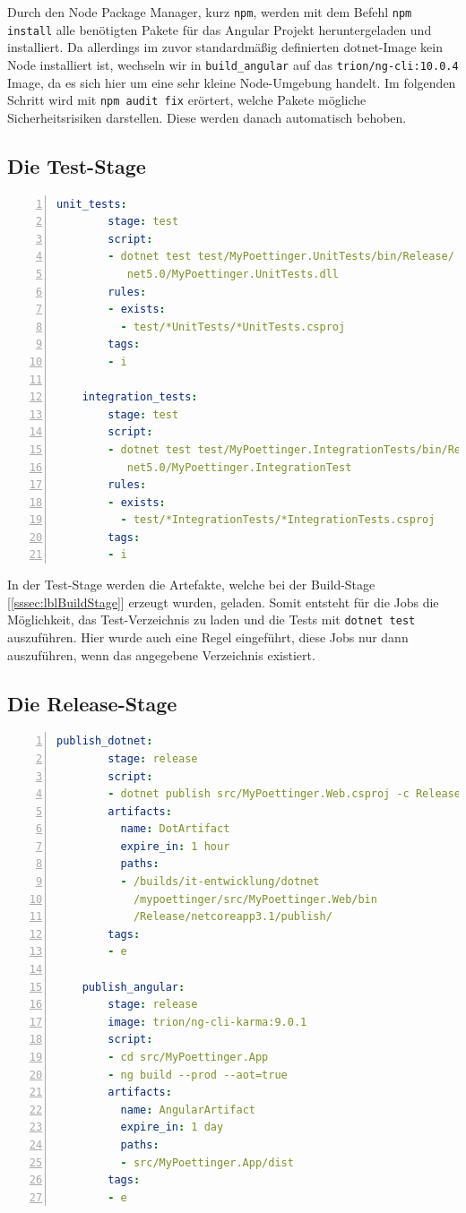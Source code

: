 Durch den Node Package Manager, kurz \texttt{npm}, werden mit dem Befehl \texttt{npm install} alle benötigten Pakete für das Angular Projekt heruntergeladen und installiert. Da allerdings im zuvor standardmäßig definierten dotnet-Image kein Node installiert ist, wechseln wir in \texttt{build\_angular} auf das \texttt{trion/ng-cli:10.0.4} Image, da es sich hier um eine sehr kleine Node-Umgebung handelt. Im folgenden Schritt wird mit \texttt{npm audit fix} erörtert, welche Pakete mögliche Sicherheitsrisiken darstellen. Diese werden danach automatisch behoben. 

\newpage

\subsection{Die Test-Stage}

\begin{lstlisting}[caption={Die Test-Stage der gitlab-ci.yml Datei},captionpos=b, numbers=left, backgroundcolor=\color{black!10},
language=yaml]
	unit_tests:
		stage: test
		script: 
		- dotnet test test/MyPoettinger.UnitTests/bin/Release/
		   net5.0/MyPoettinger.UnitTests.dll
		rules:
		- exists:
		  - test/*UnitTests/*UnitTests.csproj
		tags:
		- i  
	
	integration_tests:
		stage: test
		script: 
		- dotnet test test/MyPoettinger.IntegrationTests/bin/Release/
		   net5.0/MyPoettinger.IntegrationTest
		rules:
		- exists:
		  - test/*IntegrationTests/*IntegrationTests.csproj
		tags:
		- i
\end{lstlisting}

In der Test-Stage werden die Artefakte, welche bei der Build-Stage [\ref{sssec:lblBuildStage}] erzeugt wurden, geladen. Somit entsteht für die Jobs die Möglichkeit, das Test-Verzeichnis zu laden und die Tests mit \texttt{dotnet test} auszuführen. Hier wurde auch eine Regel eingeführt, diese Jobs nur dann auszuführen, wenn das angegebene Verzeichnis existiert. 

\newpage

\subsection{Die Release-Stage}

\begin{lstlisting}[caption={Die Release-Stage der gitlab-ci.yml Datei},captionpos=b, numbers=left, backgroundcolor=\color{black!10}, language=yaml]
	publish_dotnet:
		stage: release
		script:
		- dotnet publish src/MyPoettinger.Web.csproj -c Release
		artifacts:
		  name: DotArtifact
		  expire_in: 1 hour
		  paths:
		  - /builds/it-entwicklung/dotnet
		    /mypoettinger/src/MyPoettinger.Web/bin
		    /Release/netcoreapp3.1/publish/
		tags:
		- e
		
	publish_angular:
		stage: release
		image: trion/ng-cli-karma:9.0.1
		script:
		- cd src/MyPoettinger.App
		- ng build --prod --aot=true
		artifacts:
	  	  name: AngularArtifact
		  expire_in: 1 day
		  paths:
		  - src/MyPoettinger.App/dist
		tags:
		- e
\end{lstlisting}

